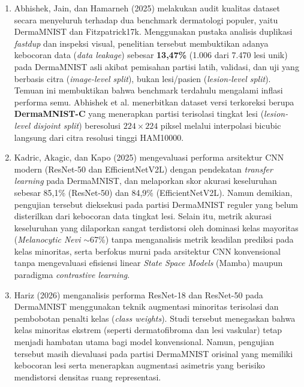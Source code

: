 \begin{enumerate}[noitemsep]
	\item Abhishek, Jain, dan Hamarneh (2025) \cite{abhishek2025investigating} melakukan audit kualitas dataset secara menyeluruh terhadap dua benchmark dermatologi populer, yaitu DermaMNIST dan Fitzpatrick17k. Menggunakan pustaka analisis duplikasi \textit{fastdup} dan inspeksi visual, penelitian tersebut membuktikan adanya kebocoran data (\textit{data leakage}) sebesar \textbf{13,47\%} (1.006 dari 7.470 lesi unik) pada DermaMNIST asli akibat pemisahan partisi latih, validasi, dan uji yang berbasis citra (\textit{image-level split}), bukan lesi/pasien (\textit{lesion-level split}). Temuan ini membuktikan bahwa benchmark terdahulu mengalami inflasi performa semu. Abhishek et al. menerbitkan dataset versi terkoreksi berupa \textbf{DermaMNIST-C} yang menerapkan partisi terisolasi tingkat lesi (\textit{lesion-level disjoint split}) beresolusi $224 \times 224$ piksel melalui interpolasi bicubic langsung dari citra resolusi tinggi HAM10000. \par

	\item Kadric, Akagic, dan Kapo (2025) \cite{kadric2025improving} mengevaluasi performa arsitektur CNN modern (ResNet-50 dan EfficientNetV2L) dengan pendekatan \textit{transfer learning} pada DermaMNIST, dan melaporkan skor akurasi keseluruhan sebesar 85,1\% (ResNet-50) dan 84,9\% (EfficientNetV2L). Namun demikian, pengujian tersebut dieksekusi pada partisi DermaMNIST reguler yang belum disterilkan dari kebocoran data tingkat lesi. Selain itu, metrik akurasi keseluruhan yang dilaporkan sangat terdistorsi oleh dominasi kelas mayoritas (\textit{Melanocytic Nevi} $\sim$67\%) tanpa menganalisis metrik keadilan prediksi pada kelas minoritas, serta berfokus murni pada arsitektur CNN konvensional tanpa mengevaluasi efisiensi linear \textit{State Space Models} (Mamba) maupun paradigma \textit{contrastive learning}. \par

	\item Hariz (2026) \cite{hariz2026analisis} menganalisis performa ResNet-18 dan ResNet-50 pada DermaMNIST menggunakan teknik augmentasi minoritas terisolasi dan pembobotan penalti kelas (\textit{class weights}). Studi tersebut menegaskan bahwa kelas minoritas ekstrem (seperti dermatofibroma dan lesi vaskular) tetap menjadi hambatan utama bagi model konvensional. Namun, pengujian tersebut masih dievaluasi pada partisi DermaMNIST orisinal yang memiliki kebocoran lesi serta menerapkan augmentasi asimetris yang berisiko mendistorsi densitas ruang representasi. \par


\end{enumerate}
